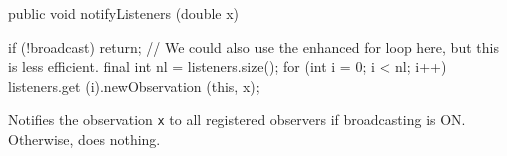 \begin{code}

   public void notifyListeners (double x)\begin{hide} {
      if (!broadcast)
         return;
      // We could also use the enhanced for loop here, but this is less efficient.
      final int nl = listeners.size();
      for (int i = 0; i < nl; i++)
         listeners.get (i).newObservation (this, x);
   }\end{hide}
\end{code}
\begin{tabb}   Notifies the observation \texttt{x} to all registered observers
   if broadcasting is ON.  Otherwise, does nothing.
\end{tabb}
\begin{code}\begin{hide}

   public StatProbe clone() throws CloneNotSupportedException {
      StatProbe s = (StatProbe)super.clone();
      s.listeners = new ArrayList<ObservationListener>(listeners);
      return s;
   }
}
\end{hide}
\end{code}
